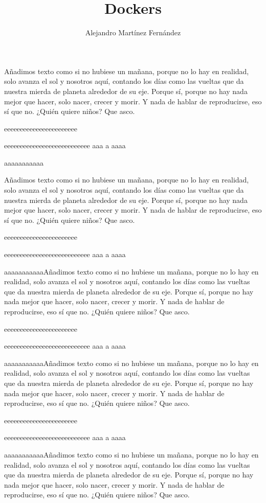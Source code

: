 \documentclass[]{article}
\title{Dockers}
\author{Alejandro Martínez Fernández}
\begin{document}
\maketitle

Añadimos texto como si no hubiese un mañana, porque no lo hay en realidad, solo avanza el sol y nosotros aquí, contando los días como las vueltas que da nuestra mierda de planeta alrededor de su eje.
Porque sí, porque no hay nada mejor que hacer, solo nacer, crecer y morir. Y nada de hablar de reproducirse, eso sí que no. ¿Quién quiere niños? Que asco.

eeeeeeeeeeeeeeeeeeeeeee

eeeeeeeeeeeeeeeeeeeeeeeeeee
aaa
a
aaaa

aaaaaaaaaaa

Añadimos texto como si no hubiese un mañana, porque no lo hay en realidad, solo avanza el sol y nosotros aquí, contando los días como las vueltas que da nuestra mierda de planeta alrededor de su eje.
Porque sí, porque no hay nada mejor que hacer, solo nacer, crecer y morir. Y nada de hablar de reproducirse, eso sí que no. ¿Quién quiere niños? Que asco.

eeeeeeeeeeeeeeeeeeeeeee

eeeeeeeeeeeeeeeeeeeeeeeeeee
aaa
a
aaaa

aaaaaaaaaaaAñadimos texto como si no hubiese un mañana, porque no lo hay en realidad, solo avanza el sol y nosotros aquí, contando los días como las vueltas que da nuestra mierda de planeta alrededor de su eje.
Porque sí, porque no hay nada mejor que hacer, solo nacer, crecer y morir. Y nada de hablar de reproducirse, eso sí que no. ¿Quién quiere niños? Que asco.

eeeeeeeeeeeeeeeeeeeeeee

eeeeeeeeeeeeeeeeeeeeeeeeeee
aaa
a
aaaa

aaaaaaaaaaaAñadimos texto como si no hubiese un mañana, porque no lo hay en realidad, solo avanza el sol y nosotros aquí, contando los días como las vueltas que da nuestra mierda de planeta alrededor de su eje.
Porque sí, porque no hay nada mejor que hacer, solo nacer, crecer y morir. Y nada de hablar de reproducirse, eso sí que no. ¿Quién quiere niños? Que asco.

eeeeeeeeeeeeeeeeeeeeeee

eeeeeeeeeeeeeeeeeeeeeeeeeee
aaa
a
aaaa

aaaaaaaaaaaAñadimos texto como si no hubiese un mañana, porque no lo hay en realidad, solo avanza el sol y nosotros aquí, contando los días como las vueltas que da nuestra mierda de planeta alrededor de su eje.
Porque sí, porque no hay nada mejor que hacer, solo nacer, crecer y morir. Y nada de hablar de reproducirse, eso sí que no. ¿Quién quiere niños? Que asco.
\end{document}

